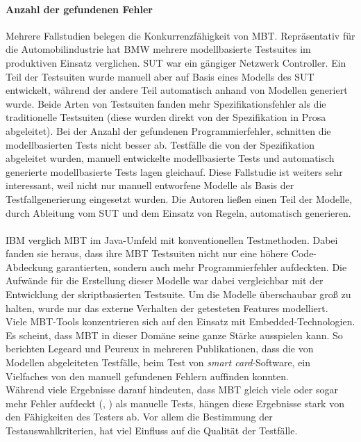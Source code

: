 \paragraph{Anzahl der gefundenen Fehler} Mehrere Fallstudien belegen die Konkurrenzfähigkeit von MBT. Repräsentativ für die Automobilindustrie hat BMW mehrere modellbasierte Testsuites im produktiven Einsatz verglichen.\cite{pretschner_one_2005} SUT war ein gängiger Netzwerk Controller. Ein Teil der Testsuiten wurde manuell aber auf Basis eines Modells des SUT entwickelt, während der andere Teil automatisch anhand von Modellen generiert wurde. Beide Arten von Testsuiten fanden mehr Spezifikationsfehler als die traditionelle Testsuiten (diese wurden direkt von der Spezifikation in Prosa abgeleitet). Bei der Anzahl der gefundenen Programmierfehler, schnitten die modellbasierten Tests nicht besser ab. Testfälle die von der Spezifikation abgeleitet wurden, manuell entwickelte modellbasierte Tests und automatisch generierte modellbasierte Tests lagen gleichauf. Diese Fallstudie ist weiters sehr interessant, weil nicht nur manuell entworfene Modelle als Basis der Testfallgenerierung eingesetzt wurden. Die Autoren ließen einen Teil der Modelle, durch Ableitung vom SUT und dem Einsatz von Regeln, automatisch generieren.\\  \\
IBM verglich MBT im Java-Umfeld mit konventionellen Testmethoden.\cite{farchi_using_2002} Dabei fanden sie heraus, dass ihre MBT Testsuiten nicht nur eine höhere Code-Abdeckung garantierten, sondern auch mehr Programmierfehler aufdeckten. Die Aufwände für die Erstellung dieser Modelle war dabei vergleichbar mit der Entwicklung der skriptbasierten Testsuite. Um die Modelle überschaubar groß zu halten, wurde nur das externe Verhalten der getesteten Features modelliert.\\
Viele MBT-Tools konzentrieren sich auf den Einsatz mit Embedded-Technologien. Es scheint, dass MBT in dieser Domäne seine ganze Stärke ausspielen kann. So berichten Legeard und Peureux in mehreren Publikationen, dass die von Modellen abgeleiteten Testfälle,  beim Test von \textit{smart card}-Software, ein Vielfaches von den manuell gefundenen Fehlern auffinden konnten.\cite{legeard_generation_2001}\\
Während viele Ergebnisse darauf hindeuten, dass MBT gleich viele oder sogar mehr Fehler aufdeckt (\cite{dalal_model-based_1999}, \cite{legeard_generation_2001}) als manuelle Tests, hängen diese Ergebnisse stark von den Fähigkeiten des Testers ab. Vor allem die Bestimmung der Testauswahlkriterien, hat viel Einfluss auf die Qualität der Testfälle.\cite{utting_practical_2007}

